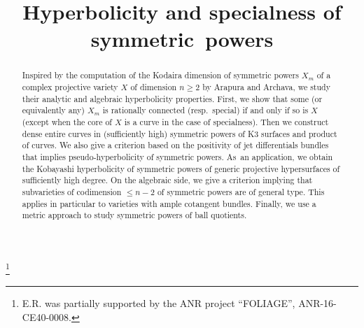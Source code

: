 \documentclass[JEP,XML,SOM,Unicode, NoEqCountersInSection,NoFloatCountersInSection,published]{cedram}
\theoremstyle{theorem}
\theoremstyle{definition}
\begin{document}
\frontmatter
\title{Hyperbolicity and specialness of symmetric~powers}

\author[\initial{B.} \lastname{Cadorel}]{ }
\address{Institut Élie Cartan de Lorraine, UMR 7502, Université de Lorraine, Site de Nancy\\
B.P. 70239, F-54506 Vand{\oe}uvre-lès-Nancy Cedex, France}

\author[\initial{F.} \lastname{Campana}]{ }
\address{Institut Élie Cartan de Lorraine, UMR 7502, Université de Lorraine, Site de Nancy\\
B.P. 70239, F-54506 Vand{\oe}uvre-lès-Nancy Cedex, France}

\author[\initial{E.} \lastname{Rousseau}]{ }
\address{Institut Universitaire de France \& Univ Brest, CNRS UMR 6205, Laboratoire de Mathématiques de Bretagne Atlantique\\
6, avenue Victor Le Gorgeu,
29238 Brest Cedex 3, France}

\thanks{E.R. was partially supported by the ANR project ``FOLIAGE'', ANR-16-CE40-0008.}

\begin{abstract}
Inspired by the computation of the Kodaira dimension of symmetric powers $X_m$ of a complex projective variety $X$ of dimension $n \geq 2$ by Arapura and Archava, we study their analytic and algebraic hyperbolicity properties. First, we show that some (or equivalently any) $X_m$ is rationally connected (resp.\ special) if and only if so is $X$ (except when the core of $X$ is a curve in the case of specialness). Then we construct dense entire curves in (sufficiently high) symmetric powers of K3 surfaces and product of curves. We also give a criterion based on the positivity of jet differentials bundles that implies pseudo-hyperbolicity of symmetric powers. As~an application, we obtain the Kobayashi hyperbolicity of symmetric powers of generic projective hypersurfaces of sufficiently high degree. On the algebraic side, we give a criterion implying that subvarieties of codimension $\leq n-2$ of symmetric powers are of general type. This applies in particular to varieties with ample cotangent bundles. Finally, we use a metric approach to study symmetric powers of ball quotients.
\end{abstract}
\end{document}
